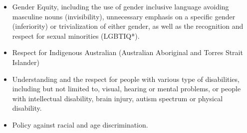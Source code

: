 \documentclass[12pt]{article}
\begin{document}
\begin{itemize}
 \item Gender Equity, including the use of gender inclusive language
       avoiding masculine nouns (invisibility), unnecessary emphasis on
       a specific gender (inferiority) or trivialization of either
       gender, as well as the recognition and respect for sexual
       minorities (LGBTIQ*).
 \item Respect for Indigenous Australian (Australian Aboriginal and Torres Strait Islander)
 \item Understanding and the respect for people with various type of
       disabilities, including but not limited to, visual, hearing or
       mental problems, or people with intellectual disability, brain
       injury, autism spectrum or physical disability.
 \item Policy against racial and age discrimination.
\end{itemize}



\end{document}
